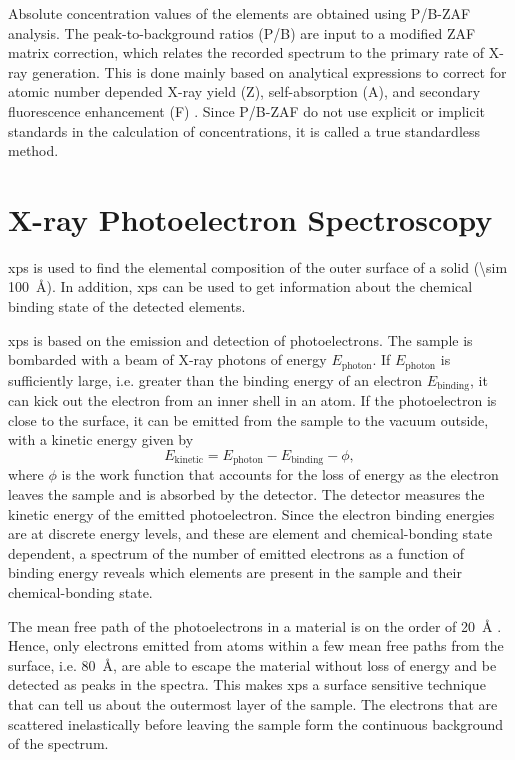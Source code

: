 Absolute concentration values of the elements are obtained using P/B-ZAF analysis. The peak-to-background ratios (P/B) are input to a modified ZAF matrix correction, which relates the recorded spectrum to the primary rate of X-ray generation. This is done mainly based on analytical expressions to correct for atomic number depended X-ray yield (Z), self-absorption (A), and secondary fluorescence enhancement (F) \citep{quantax2008microanalysis}. Since P/B-ZAF do not use explicit or implicit standards in the calculation of concentrations, it is called a true standardless method.%


\section{X-ray Photoelectron Spectroscopy}\label{sec:xps}
\Acf{xps} is used to find the elemental composition of the outer surface of a solid (\SI{\sim 100}{\angstrom}). In addition, \ac{xps} can be used to get information about the chemical binding state of the detected elements.

\Ac{xps} is based on the emission and detection of photoelectrons. The sample is bombarded with a beam of X-ray photons of energy $E_\text{photon}$. If $E_\text{photon}$ is sufficiently large, i.e. greater than the binding energy of an electron $E_\text{binding}$, it can kick out the electron from an inner shell in an atom. If the photoelectron is close to the surface, it can be emitted from the sample to the vacuum outside, with a kinetic energy given by
\begin{equation}
    E_\text{kinetic} = E_\text{photon} - E_\text{binding} - \phi,
\end{equation}
where $\phi$ is the work function that accounts for the loss of energy as the electron leaves the sample and is absorbed by the detector. The detector measures the kinetic energy of the emitted photoelectron. Since the electron binding energies are at discrete energy levels, and these are element and chemical-bonding state dependent, a spectrum of the number of emitted electrons as a function of binding energy reveals which elements are present in the sample and their chemical-bonding state.

The mean free path of the photoelectrons in a material is on the order of \SI{20}{\angstrom} \citep{tanuma1991calculations}. Hence, only electrons emitted from atoms within a few mean free paths from the surface, i.e. \SI{80}{\angstrom}, are able to escape the material without loss of energy and be detected as peaks in the spectra. This makes \ac{xps} a surface sensitive technique that can tell us about the outermost layer of the sample. The electrons that are scattered inelastically before leaving the sample form the continuous background of the spectrum.

